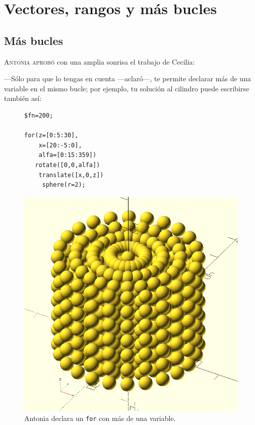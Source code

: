 \chapter{Vectores, rangos y más bucles}
\label{sec:vectores}
  
\section{Más bucles}

\lettrine[lines=2]{A}{ntonia aprobó} con una amplia sonrisa el trabajo de
Cecilia:

---Só\-lo para que lo tengas en cuenta ---aclaró---,
\openscad{} te permite declarar más de una variable en el mismo bucle;
por ejemplo, tu solución al cilindro puede escribirse también así:

  \begin{figure}[ht]
  \begin{minipage}[]{.5\textwidth}
    \begin{lstlisting}
$fn=200;

for(z=[0:5:30],
    x=[20:-5:0],
    alfa=[0:15:359])
   rotate([0,0,alfa])
    translate([x,0,z])
     sphere(r=2);
    \end{lstlisting}%
  \end{minipage}\hfill
    \begin{minipage}[]{.5\textwidth}
      \centering
      \includegraphics[width=.8\textwidth]{imagenes/cilindro-de-esferas}
    \end{minipage}
    \caption{Antonia declara un \lstinline!for! con más de una
      variable.}
      \label{fig:cilindro-de-esferas-10}
    \end{figure}


